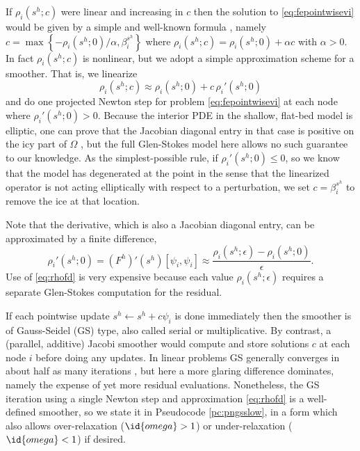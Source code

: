 \documentclass[letterpaper,final,12pt,reqno]{amsart}
\theoremstyle{claim}
\newcommand{\eps}{\epsilon}
\numberwithin{equation}{section}
\numberwithin{figure}{section}
\numberwithin{table}{section}
\numberwithin{theorem}{section}
\begin{document}
If $\rho_i(s^h; c)$ were linear and increasing in $c$ then the solution to \eqref{eq:fepointwisevi} would be given by a simple and well-known formula \cite[formula (4.4), for example]{GraeserKornhuber2009}, namely $c = \max\left\{-\rho_i(s^h; 0)/\alpha, \beta_i^{s^h}\right\}$ where $\rho_i(s^h; c) = \rho_i(s^h; 0) + \alpha c$ with $\alpha > 0$.  In fact $\rho_i(s^h; c)$ is nonlinear, but we adopt a simple approximation scheme for a smoother.  That is, we linearize
\begin{equation}
\rho_i(s^h; c) \approx \rho_i(s^h; 0) + c\, \rho_i'(s^h; 0) \label{eq:rhoapprox}
\end{equation}
and do one projected Newton step for problem \eqref{eq:fepointwisevi} at each node where $\rho_i'(s^h; 0) > 0$.  Because the interior PDE in the shallow, flat-bed model is elliptic, one can prove that the Jacobian diagonal entry in that case is positive on the icy part of $\Omega$ \cite{JouvetBueler2012}, but the full Glen-Stokes model here allows no such guarantee to our knowledge.  As the simplest-possible rule, if $\rho_i'(s^h; 0) \le 0$, so we know that the model has degenerated at the point in the sense that the linearized operator is not acting elliptically with respect to a perturbation, we set $c = \beta_i^{s^h}$ to remove the ice at that location.  %

Note that the derivative, which is also a Jacobian diagonal entry, can be approximated by a finite difference,
\begin{equation}
\rho_i'(s^h; 0) = (F^h)'(s^h)[\psi_i,\psi_i] \approx \frac{\rho_i(s^h; \eps) - \rho_i(s^h; 0)}{\eps}.  \label{eq:rhofd}
\end{equation}
Use of \eqref{eq:rhofd} is very expensive because each value $\rho_i(s^h; \eps)$ requires a separate Glen-Stokes computation for the residual.

If each pointwise update $s^h \gets s^h + c \psi_i$ is done immediately then the smoother is of Gauss-Seidel (GS) type, also called serial or multiplicative.  By contrast, a (parallel, additive) Jacobi smoother would compute and store solutions $c$ at each node $i$ before doing any updates.  In linear problems GS generally converges in about half as many iterations \cite{Greenbaum1997}, but here a more glaring difference dominates, namely the expense of yet more residual evaluations.  Nonetheless, the GS iteration using a single Newton step and approximation \eqref{eq:rhofd} is a well-defined smoother, so we state it in Pseudocode \ref{pc:pngsslow}, in a form which also allows over-relaxation ($\id{omega} > 1$) or under-relaxation ($\id{omega} < 1$) if desired.
\end{document}
